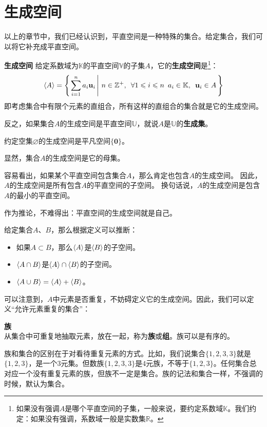 \documentclass[12pt,UTF8,fontset=none]{ctexbook}
\begin{document}
\section{生成空间}
以上的章节中，我们已经认识到，平直空间是一种特殊的集合。给定集合，我们可以将它补充成平直空间。
\begin{df}{\textbf{生成空间}}
    给定系数域为$\mathbb{K}$的平直空间$\mathbb{V}$的子集$A$，它的\textbf{生成空间}是\footnote{如果没有强调$A$是哪个平直空间的子集，一般来说，要约定系数域$\mathbb{K}$。我们约定：如果没有强调，系数域一般是实数集$\mathbb{R}$。}：
    $$ \left\langle A \right\rangle = \left\{\left. \sum_{i=1}^n a_i \mathbf{u}_i \, \right| \, n\in\mathbb{Z}^+, \,\,\, \forall 1\leqslant i \leqslant n \,\,\, a_i \in \mathbb{K}, \,\,\, \mathbf{u}_i \in A\, \right\} $$
    即考虑集合中有限个元素的直组合，所有这样的直组合的集合就是它的生成空间。
    
    反之，如果集合$A$的生成空间是平直空间$\mathbb{U}$，就说$A$是$\mathbb{U}$的\textbf{生成集}。

    约定空集$\varnothing$的生成空间是平凡空间$\{\mathbf{0}\}$。
\end{df}

显然，集合$A$的生成空间是它的母集。

容易看出，如果某个平直空间包含集合$A$，那么肯定也包含$A$的生成空间。
因此，$A$的生成空间是所有包含$A$的平直空间的子空间。
换句话说，$A$的生成空间是包含$A$的最小的平直空间。

作为推论，不难得出：平直空间的生成空间就是自己。

给定集合$A$、$B$，那么根据定义可以推断：
\begin{itemize}
    \item 如果$A\subset B$，那么$\left\langle A \right\rangle$是$\left\langle B \right\rangle$的子空间。
    \item $\left\langle A\cap B \right\rangle$是$\left\langle A \right\rangle\cap\left\langle B \right\rangle$的子空间。
    \item $\left\langle A\cup B \right\rangle = \left\langle A \right\rangle + \left\langle B \right\rangle$。
\end{itemize}

可以注意到，$A$中元素是否重复，不妨碍定义它的生成空间。因此，我们可以定义“允许元素重复的集合”：
\begin{df}{\textbf{族}}
    \mbox{} \\
    从集合中可重复地抽取元素，放在一起，称为\textbf{族}或\textbf{组}。族可以是有序的。
\end{df}
族和集合的区别在于对看待重复元素的方式。比如，我们说集合$\{1,2,3,3\}$就是$\{1,2,3\}$，是一个$3$元集。但数族$\{1,2,3,3\}$是$4$元族，不等于$\{1,2,3\}$。任何集合总对应一个没有重复元素的族，但族不一定是集合。族的记法和集合一样，不强调的时候，默认为集合。
\end{document}
